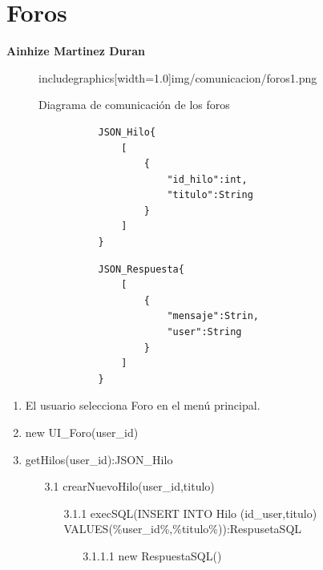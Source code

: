 ﻿\documentclass{report}
\begin{document}
        \section{Foros}
            \textbf{Ainhize Martinez Duran}
            \begin{figure}[H]
                \centering
                includegraphics[width=1.0\textwidth]{img/comunicacion/foros1.png}
                \caption{Diagrama de comunicación de los foros}
            \end{figure}
            \begin{verbatim}
                JSON_Hilo{
                    [
                        {
                            "id_hilo":int,
                            "titulo":String
                        }
                    ]
                }
            \end{verbatim}
            \begin{verbatim}
                JSON_Respuesta{
                    [
                        {
                            "mensaje":Strin,
                            "user":String
                        }
                    ]
                }
            \end{verbatim}
            \begin{enumerate}
                \item El usuario selecciona Foro en el menú principal.
                \item new UI\_Foro(user\_id)
                \item getHilos(user\_id):JSON\_Hilo
                \begin{enumerate}
                    \item [3.1] crearNuevoHilo(user\_id,titulo)
                    \begin{enumerate}
                        \item [3.1.1] execSQL(INSERT INTO Hilo (id\_user,titulo) VALUES(\%user\_id\%,\%titulo\%)):RespusetaSQL
                        \begin{enumerate}
                            \item [3.1.1.1] new RespuestaSQL()
                        \end{enumerate}
                    \end{enumerate}
                \end{enumerate}
            \end{enumerate}
            
\end{document}
